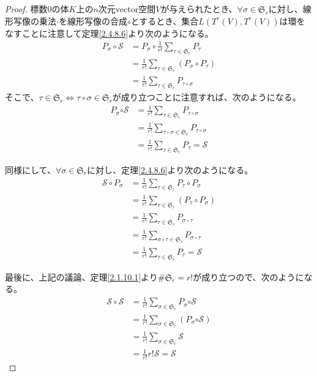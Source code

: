\documentclass[dvipdfmx]{jsarticle}
\begin{document}
\begin{proof}
標数$0$の体$K$上の$n$次元vector空間$V$が与えられたとき、$\forall\sigma \in \mathfrak{S}_{r}$に対し、線形写像の乗法$\cdot$を線形写像の合成$\circ$とするとき、集合$L\left( T^{r}(V),T^{r}(V) \right)$は環をなすことに注意して定理\ref{2.4.8.6}より次のようになる。
\begin{align*}
P_{\sigma} \circ \mathcal{S} &= P_{\sigma} \circ \frac{1}{r!}\sum_{\tau \in \mathfrak{S}_{r}} P_{\tau}\\
&= \frac{1}{r!}\sum_{\tau \in \mathfrak{S}_{r}} \left( P_{\sigma} \circ P_{\tau} \right)\\
&= \frac{1}{r!}\sum_{\tau \in \mathfrak{S}_{r}} P_{\tau \circ \sigma}
\end{align*}
そこで、$\tau \in \mathfrak{S}_{r} \Leftrightarrow \tau \circ \sigma \in \mathfrak{S}_{r}$が成り立つことに注意すれば、次のようになる。
\begin{align*}
P_{\sigma}\mathcal{\circ S} &= \frac{1}{r!}\sum_{\tau \in \mathfrak{S}_{r}} P_{\tau \circ \sigma}\\
&= \frac{1}{r!}\sum_{\tau \circ \sigma \in \mathfrak{S}_{r}} P_{\tau \circ \sigma}\\
&= \frac{1}{r!}\sum_{\tau \in \mathfrak{S}_{r}} P_{\tau} = \mathcal{S}
\end{align*}\par
同様にして、$\forall\sigma \in \mathfrak{S}_{r}$に対し、定理\ref{2.4.8.6}より次のようになる。
\begin{align*}
\mathcal{S \circ}P_{\sigma} &= \frac{1}{r!}\sum_{\tau \in \mathfrak{S}_{r}} P_{\tau} \circ P_{\sigma}\\
&= \frac{1}{r!}\sum_{\tau \in \mathfrak{S}_{r}} \left( P_{\tau} \circ P_{\sigma} \right)\\
&= \frac{1}{r!}\sum_{\tau \in \mathfrak{S}_{r}} P_{\sigma \circ \tau}\\
&= \frac{1}{r!}\sum_{\sigma \circ \tau \in \mathfrak{S}_{r}} P_{\sigma \circ \tau}\\
&= \frac{1}{r!}\sum_{\tau \in \mathfrak{S}_{r}} P_{\tau}=\mathcal{S}
\end{align*}\par
最後に、上記の議論、定理\ref{2.1.10.1}より${\#}\mathfrak{S}_{r} = r!$が成り立つので、次のようになる。
\begin{align*}
\mathcal{S \circ S} &= \frac{1}{r!}\sum_{\sigma \in \mathfrak{S}_{r}} P_{\sigma}\mathcal{\circ S}\\
&= \frac{1}{r!}\sum_{\sigma \in \mathfrak{S}_{r}} \left( P_{\sigma}\mathcal{\circ S} \right)\\
&= \frac{1}{r!}\sum_{\sigma \in \mathfrak{S}_{r}} \mathcal{S}\\
&= \frac{1}{r!}r!\mathcal{S} = \mathcal{S}
\end{align*}
\end{proof}
\end{document}
